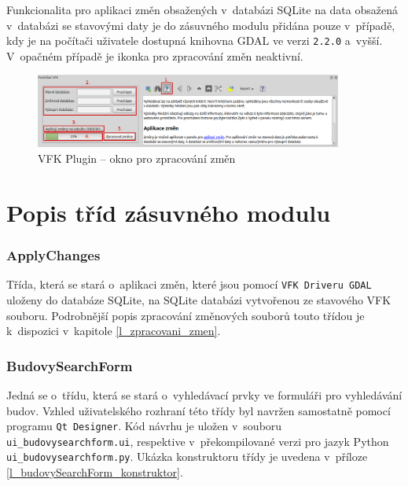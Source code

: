 \documentclass[a4paper,12pt,oneside]{book}
\begin{document}
Funkcionalita pro aplikaci změn obsažených v~databázi SQLite na data
obsažená v~databázi se stavovými daty je do zásuvného modulu přidána
pouze v~případě, kdy je na počítači uživatele dostupná knihovna GDAL
ve verzi \texttt{2.2.0} a~vyšší. V~opačném případě je ikonka pro
zpracování změn neaktivní.

\begin{figure}[htb]
\centering
\includegraphics[width=0.9\textwidth]{images/vfkPlugin-zmeny.png}
\caption[VFK Plugin -- okno pro zpracování změn]{VFK Plugin -- okno pro zpracování změn}
\label{l_plugin_zmeny}
\end{figure}


\clearpage
\section{Popis tříd zásuvného modulu}

\subsubsection{ApplyChanges}
Třída, která se stará o~aplikaci změn, které jsou pomocí \texttt{VFK
  Driveru GDAL} uloženy do databáze SQLite, na SQLite databázi
vytvořenou ze stavového VFK souboru. Podrobnější popis zpracování
změnových souborů touto třídou je k~dispozici v~kapitole
\ref{l_zpracovani_zmen}.

\subsubsection{BudovySearchForm}
Jedná se o~třídu, která se stará o~vyhledávací prvky ve formuláři pro
vyhledávání budov. Vzhled
uživatelského rozhraní této třídy byl navržen samostatně pomocí
programu \texttt{Qt Designer}. Kód návrhu je uložen v~souboru
\texttt{ui\_budovysearchform.ui}, respektive v~překompilované verzi
pro jazyk Python \texttt{ui\_budovysearchform.py}. Ukázka konstruktoru
třídy je uvedena v~příloze \ref{l_budovySearchForm_konstruktor}.
\end{document}
